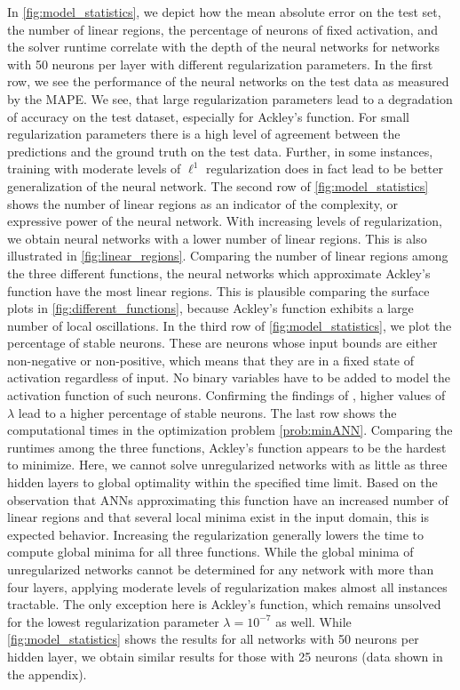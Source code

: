 In \vref{fig:model_statistics}, we depict how the mean absolute error on the test set, the number of linear regions, the percentage of neurons of fixed activation, and the solver runtime correlate with the depth of the neural networks for networks with 50 neurons per layer with different regularization parameters. 
In the first row, we see the performance of the neural networks on the test data as measured by the MAPE. We see, that large regularization parameters lead to a degradation of accuracy on the test dataset, especially for Ackley's function. For small regularization parameters there is a high level of agreement between the predictions and the ground truth on the test data. Further, in some instances, training with moderate levels of $\ell^1$ regularization does in fact lead to be better generalization of the neural network. 
%
The second row of \cref{fig:model_statistics} shows the number of linear regions as an indicator of the complexity, or expressive power of the neural network. With increasing levels of regularization, we obtain neural networks with a lower number of linear regions. This is also illustrated in \vref{fig:linear_regions}. Comparing the number of linear regions among the three different functions, the neural networks which approximate Ackley's function have the most linear regions. This is plausible comparing the surface plots in \vref{fig:different_functions}, because Ackley's function exhibits a large number of local oscillations.
%
In the third row of \cref{fig:model_statistics}, we plot the percentage of stable neurons. These are neurons whose input bounds are either non-negative or non-positive, which means that they are in a fixed state of activation regardless of input. No binary variables have to be added to model the activation function of such neurons. Confirming the findings of \citet{Xiao2019,Serra2020}, higher values of $\lambda$ lead to a higher percentage of stable neurons. 
%
The last row shows the computational times in the optimization problem \eqref{prob:minANN}. Comparing the runtimes among the three functions, Ackley's function appears to be the hardest to minimize. Here, we cannot solve unregularized networks with as little as three hidden layers to global optimality within the specified time limit. Based on the observation that ANNs approximating this function have an increased number of linear regions and that several local minima exist in the input domain, this is expected behavior. Increasing the regularization generally lowers the time to compute global minima for all three functions. While the global minima of unregularized networks cannot be determined for any network with more than four layers, applying moderate levels of regularization makes almost all instances tractable. The only exception here is Ackley's function, which remains unsolved for the lowest regularization parameter $\lambda = 10^{-7}$ as well. While \cref{fig:model_statistics} shows the results for all networks with 50 neurons per hidden layer, we obtain similar results for those with 25 neurons (data shown in the appendix).
